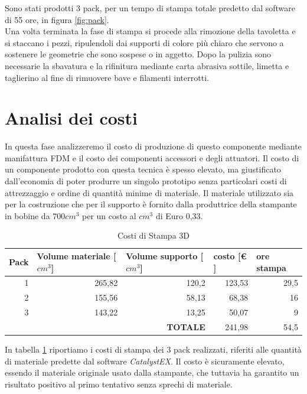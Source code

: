 \documentclass[%
corpo=11pt,
twoside,
 stile=classica,
oldstyle,
greek,%
]{toptesi}
\begin{document}
	Sono stati prodotti 3 pack, per un tempo di stampa totale predetto dal software di 55 ore, in figura \ref{fig:pack}.\\
	Una volta terminata la fase di stampa si procede alla rimozione della tavoletta e si staccano i pezzi, ripulendoli dai supporti di colore più chiaro che servono a sostenere le geometrie che sono sospese o in aggetto. 
	Dopo la pulizia sono necessarie la sbavatura e la rifinitura mediante carta abrasiva sottile, limetta e taglierino al fine di rimuovere bave e filamenti interrotti. 
	
	\section{Analisi dei costi}
	In questa fase analizzeremo il costo di produzione di questo componente mediante manifattura FDM e il costo dei componenti accessori e degli attuatori. 
	Il costo di un componente prodotto con questa tecnica è spesso elevato, ma giustificato dall'economia di poter produrre un singolo prototipo senza particolari costi di attrezzaggio e ordine di quantità minime di materiale. 
	Il materiale utilizzato sia per la costruzione che per il supporto è fornito dalla produttrice della stampante in bobine da $700 cm^3$ per un costo al $cm^3$ di Euro 0,33. 
	\begin{table}[H]
		\centering
		\caption{Costi di Stampa 3D}
		\begin{tabular}{rr|r|r|r|}
			\hline
			\multicolumn{1}{|l|}{\textbf{Pack}} & \multicolumn{1}{l|}{\textbf{Volume materiale [$cm^{3}$]}} & \multicolumn{1}{l|}{\textbf{Volume supporto [$cm^{3}$]}} & \multicolumn{1}{l|}{\textbf{costo [€ ]}} & \multicolumn{1}{l|}{\textbf{ore stampa}} \bigstrut\\
			\hline
			\multicolumn{1}{|r|}{1} & 265,82 & 120,2 & 123,53 & 29,5 \bigstrut\\
			\hline
			\multicolumn{1}{|r|}{2} & 155,56 & 58,13 & 68,38 & 16 \bigstrut\\
			\hline
			\multicolumn{1}{|r|}{3} & 143,22 & 13,25 & 50,07 & 9 \bigstrut\\
			\hline
			&       & \textbf{TOTALE} & 241,98 & 54,5 \bigstrut\\
			\cline{3-5}    \end{tabular}%
		\label{tab:printcost}%
	\end{table}%
	In tabella \ref{tab:printcost} riportiamo i costi di stampa dei 3 pack realizzati, riferiti alle quantità di materiale predette dal software \textit{CatalystEX}. Il costo è sicuramente elevato, essendo il materiale originale usato dalla stampante, che tuttavia ha garantito un risultato positivo al primo tentativo senza sprechi di materiale. 
	
\end{document}
